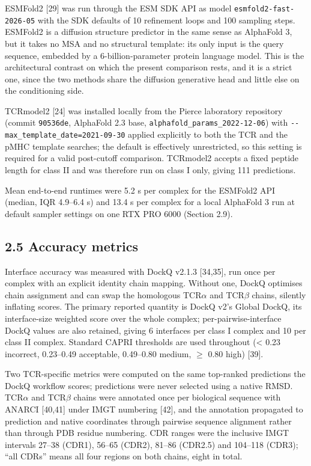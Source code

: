 \documentclass[
  11pt,
]{article}
\begin{document}
ESMFold2 {[}29{]} was run through the ESM SDK
API as model \texttt{esmfold2-fast-2026-05} with the SDK defaults of 10
refinement loops and 100 sampling steps. ESMFold2 is a diffusion
structure predictor in the same sense as AlphaFold 3, but it takes no
MSA and no structural template: its only input is the query sequence,
embedded by a 6-billion-parameter protein language model. This is the
architectural contrast on which the present comparison rests, and it is
a strict one, since the two methods share the diffusion generative head
and little else on the conditioning side.

TCRmodel2 {[}24{]} was installed locally from the Pierce laboratory
repository (commit \texttt{90536de}, AlphaFold 2.3 base,
\texttt{alphafold\_params\_2022-12-06}) with
\texttt{-\/-max\_template\_date=2021-09-30} applied explicitly to both
the TCR and the pMHC template searches; the default is effectively
unrestricted, so this setting is required for a valid post-cutoff
comparison. TCRmodel2 accepts a fixed peptide length for class II and
was therefore run on class I only, giving 111 predictions.

Mean end-to-end runtimes were 5.2 s per complex for the ESMFold2 API
(median, IQR 4.9--6.4 s) and 13.4 s per complex for a local AlphaFold 3
run at default sampler settings on one RTX PRO 6000 (Section 2.9).

\subsection{2.5 Accuracy metrics}\label{accuracy-metrics}

Interface accuracy was measured with DockQ v2.1.3 {[}34,35{]}, run once
per complex with an explicit identity chain mapping. Without one, DockQ
optimises chain assignment and can swap the homologous TCR\ensuremath{\alpha} and TCR\ensuremath{\beta}
chains, silently inflating scores. The primary reported quantity is
DockQ v2's Global DockQ, its interface-size weighted score over the
whole complex; per-pairwise-interface DockQ values are also retained,
giving 6 interfaces per class I complex and 10 per class II complex.
Standard CAPRI thresholds are used throughout (\textless{} 0.23
incorrect, 0.23--0.49 acceptable, 0.49--0.80 medium, \ensuremath{\geq} 0.80 high)
{[}39{]}.

Two TCR-specific metrics were computed on the same top-ranked
predictions the DockQ workflow scores; predictions were never selected
using a native RMSD. TCR\ensuremath{\alpha} and TCR\ensuremath{\beta} chains were annotated once per
biological sequence with ANARCI {[}40,41{]} under IMGT numbering {[}42{]},
and the annotation propagated to prediction and native coordinates
through pairwise sequence alignment rather than through PDB residue
numbering. CDR ranges were the inclusive IMGT intervals 27--38 (CDR1),
56--65 (CDR2), 81--86 (CDR2.5) and 104--118 (CDR3); ``all CDRs'' means
all four regions on both chains, eight in total.
\end{document}
